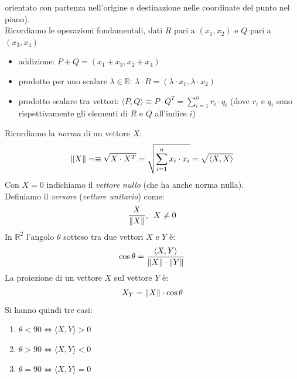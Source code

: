 \begin{esercizio}
\begin{shaded}
									      			      			orientato con partenza nell'origine e destinazione nelle coordinate del punto
									      			      			nel piano).\\
									      			      			Ricordiamo le operazioni fondamentali, dati $R$ pari a $(x_1, x_2)$ e $Q$ pari
									      			      			a $(x_3, x_4)$ 
									      			      			\begin{itemize}
									      			      				\item addizione: $P+Q=(x_1+x_3, x_2+x_4)$
									      			      				\item prodotto per uno scalare $\lambda\in\mathbb{R}$: $\lambda\cdot
									      			      				      R=(\lambda\cdot x_1,\lambda\cdot x_2)$
									      			      				\item prodotto scalare tra vettori: $\langle P, Q\rangle\equiv P\cdot Q^T =
									      			      				      \sum_{i=1}^n r_i\cdot q_i$ 
									      			      				      (dove $r_i$ e $q_i$ sono rispettivamente gli elementi di $R$ e $Q$
									      			      				      all'indice $i$)
									      			      			\end{itemize}
									      			      			Ricordiamo la \textit{norma} di un vettore $X$:
									      			      			\[\norm{X}=\equiv\sqrt{X\cdot X^T}=\sqrt{\sum_{i=1}^n x_i\cdot
									      			      					x_i}=\sqrt{\langle X, X\rangle}\] 
									      			      				Con $X=0$ indichiamo il \textit{vettore nullo} (che ha anche norma nulla).\\
									      			      				Definiamo il \textit{versore} (\textit{vettore unitario}) come:
									      			      				\[\frac{X}{\norm{X}},\,\,\, X\neq 0\]
									      			      				In $\mathbb{R}^2$ l'angolo $\theta$ sotteso tra due vettori $X$ e $Y$ è:
									      			      				\[\cos\theta=\frac{\langle X, Y\rangle}{\norm{X}\cdot \norm{Y}}\]
									      			      				La proiezione di un vettore $X$ sul vettore $Y$ è:
									      			      				\[X_Y=\norm{X}\cdot \cos\theta\]
									      			      				Si hanno quindi tre casi:
									      			      				\begin{enumerate}
									      			      					\item $\theta < 90 \iff \langle X, Y\rangle >0$
									      			      					\item $\theta > 90 \iff \langle X, Y\rangle <0$
									      			      					\item $\theta = 90 \iff \langle X, Y\rangle =0$
									      			      				\end{enumerate}

\end{shaded}
\end{esercizio}
